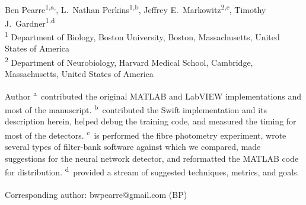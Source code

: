 \documentclass[10pt,letterpaper]{article}
\date{}
\begin{document}
\vspace*{0.35in}

\begin{flushleft}
{\Large
\textbf{}
}
\newline
\\
Ben Pearre\textsuperscript{1,a,\textcurrency},
L.~Nathan Perkins\textsuperscript{1,b},
Jeffrey E.~Markowitz\textsuperscript{2,c},
Timothy J.~Gardner\textsuperscript{1,d}
\\
\bigskip
\textsuperscript{1} Department of Biology, Boston University, Boston, Massachusetts, United States of America\\
\textsuperscript{2} Department of Neurobiology, Harvard Medical School, Cambridge, Massachusetts, United States of America
\\
\bigskip

% 
%
Author \textsuperscript{a}~contributed the original MATLAB and LabVIEW implementations and most of the manuscript.
\textsuperscript{b}~contributed the Swift implementation and its description herein, helped debug the training code, and measured the timing for most of the detectors.
\textsuperscript{c}~is performed the fibre photometry experiment, wrote several types of filter-bank software against which we compared, made suggestions for the neural network detector, and reformatted the MATLAB code for distribution.
\textsuperscript{d}~provided a stream of suggested techniques, metrics, and goals.





\textsuperscript{\textcurrency} Corresponding author: bwpearre@gmail.com (BP)

\end{flushleft}
\end{document}
